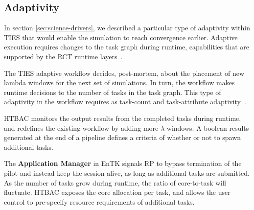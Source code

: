 

\subsection{Adaptivity}

In section \ref{sec:science-drivers}, we described a particular type of
adaptivity within TIES that would enable the simulation to reach
convergence earlier. Adaptive execution requires changes to the task graph 
during runtime, capabilities that are supported by the RCT runtime 
layers~\cite{power-of-many17}.

The TIES adaptive workflow decides, post-mortem, about the placement
of new lambda windows for the next set of simulations. In turn, the workflow
makes runtime decisions to the number of tasks in the task graph. This type of 
adaptivity in the workflow requires as task-count and task-attribute 
adaptivity~\cite{adaptivebiomolecular}. 

HTBAC monitors the output results from the completed tasks
during runtime, and redefines the existing workflow by adding more $\lambda$
windows. A boolean results generated at the end of a pipeline defines a criteria
of whether or not to spawn additional tasks. 

The \textbf{Application
Manager} in EnTK signals RP to bypass termination of the pilot and instead
keep the session alive, as long as additional tasks are submitted. As the
number of tasks grow during runtime, the ratio of core-to-task will fluctuate.
HTBAC exposes the core allocation per task, and allows the user control to
pre-specify resource requirements of additional tasks.




